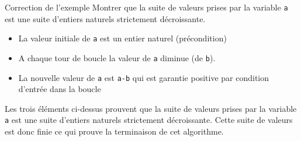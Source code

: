 \documentclass[10pt]{beamer}
\begin{document}
\begin{frame}
	\mframe{\NA}
	\begin{exampleblock}{Correction de l'exemple}
		\textcolor{OliveGreen}{Montrer que la suite de valeurs prises par la variable \texttt{a} est une suite d'entiers naturels strictement décroissante.}
		\begin{itemize}
			\item<2->{\textcolor{OliveGreen}{La valeur initiale de \texttt{a} est un entier naturel (précondition)}}
			\item<3->{\textcolor{OliveGreen}{A chaque tour de boucle la valeur de \texttt{a} diminue (de \texttt{b}).}}
			\item<4->{\textcolor{OliveGreen}{La nouvelle valeur de \texttt{a} est \texttt{a-b} qui est garantie positive par condition d'entrée dans la boucle}}
		\end{itemize}
		\textcolor{OliveGreen}{Les trois éléments ci-dessus prouvent que la suite de valeurs prises par la variable \texttt{a} est une suite d'entiers naturels strictement décroissante. Cette suite de valeurs est donc finie ce qui prouve la terminaison de cet algorithme.}
	\end{exampleblock}
\end{frame}
\end{document}
